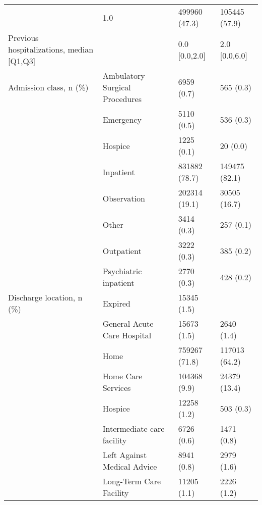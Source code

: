 \begin{tabular}{llll}
                                       & 1.0 &                  499960 (47.3) &      105445 (57.9) \\
Previous hospitalizations, median [Q1,Q3] &   &                  0.0 [0.0,2.0] &      2.0 [0.0,6.0] \\
Admission class, n (\%) & Ambulatory Surgical Procedures &                     6959 (0.7) &          565 (0.3) \\
                                       & Emergency &                     5110 (0.5) &          536 (0.3) \\
                                       & Hospice &                     1225 (0.1) &           20 (0.0) \\
                                       & Inpatient &                  831882 (78.7) &      149475 (82.1) \\
                                       & Observation &                  202314 (19.1) &       30505 (16.7) \\
                                       & Other &                     3414 (0.3) &          257 (0.1) \\
                                       & Outpatient &                     3222 (0.3) &          385 (0.2) \\
                                       & Psychiatric inpatient &                     2770 (0.3) &          428 (0.2) \\
Discharge location, n (\%) & Expired &                    15345 (1.5) &                    \\
                                       & General Acute Care Hospital &                    15673 (1.5) &         2640 (1.4) \\
                                       & Home &                  759267 (71.8) &      117013 (64.2) \\
                                       & Home Care Services &                   104368 (9.9) &       24379 (13.4) \\
                                       & Hospice &                    12258 (1.2) &          503 (0.3) \\
                                       & Intermediate care facility &                     6726 (0.6) &         1471 (0.8) \\
                                       & Left Against Medical Advice &                     8941 (0.8) &         2979 (1.6) \\
                                       & Long-Term Care Facility &                    11205 (1.1) &         2226 (1.2) \\

\end{tabular}
